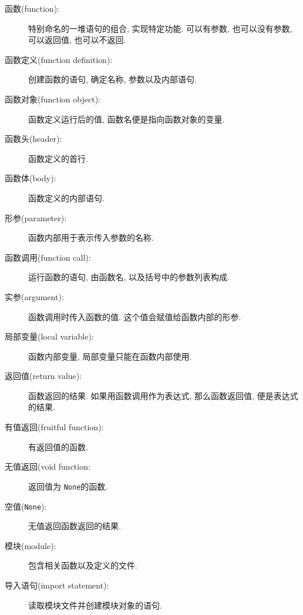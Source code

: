 \documentclass[10pt]{book}
\begin{document}
\begin{description}

\item[函数(function):] 特别命名的一堆语句的组合, 实现特定功能. 可以有参数, 
也可以没有参数, 可以返回值, 也可以不返回. 

\item[函数定义(function definition):]  创建函数的语句, 确定名称, 参数以及内部语句. 

\item[函数对象(function object):]  函数定义运行后的值, 函数名便是指向函数对象的变量. 

\item[函数头(header):] 函数定义的首行.

\item[函数体(body):] 函数定义的内部语句.

\item[形参(parameter):] 函数内部用于表示传入参数的名称. 

\item[函数调用(function call):] 运行函数的语句, 由函数名, 以及括号中的参数列表构成. 

\item[实参(argument):]  函数调用时传入函数的值. 这个值会赋值给函数内部的形参. 

\item[局部变量(local variable):]  函数内部变量, 局部变量只能在函数内部使用. 

\item[返回值(return value):]  函数返回的结果. 如果用函数调用作为表达式, 那么函数返回值, 便是表达式的结果. 

\item[有值返回(fruitful function):] 有返回值的函数. 

\item[无值返回(void function:] 返回值为 {\tt None}的函数. 

\item[空值({\tt None}):] 无值返回函数返回的结果. 

\item[模块(module):] 包含相关函数以及定义的文件. 

\item[导入语句(import statement):] 读取模块文件并创建模块对象的语句. 


\end{description}
\end{document}
